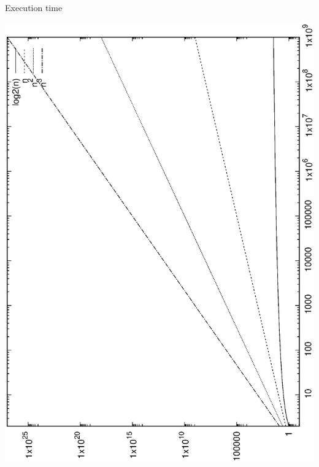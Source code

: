 \documentclass[10pt, t]{beamer}
\begin{document}
  \begin{frame}{Execution time}
    \vspace{-6ex}
    \begin{center}
      \includegraphics[width=.70\textwidth,angle=-90]{execution-time}
    \end{center}
  \end{frame}
\end{document}
